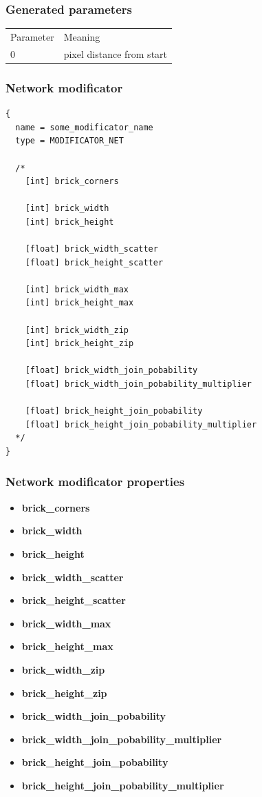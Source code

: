 \documentclass[9pt]{article}
\begin{document}
\subsubsection*{Generated parameters}

\begin{tabular}{|l||l|}
  Parameter & Meaning \\
  0 & pixel distance from start \\
\end{tabular}

\subsubsection{Network modificator}

\begin{verbatim}
{
  name = some_modificator_name
  type = MODIFICATOR_NET

  /*
    [int] brick_corners
        
    [int] brick_width
    [int] brick_height
        
    [float] brick_width_scatter
    [float] brick_height_scatter
        
    [int] brick_width_max
    [int] brick_height_max
        
    [int] brick_width_zip
    [int] brick_height_zip
        
    [float] brick_width_join_pobability
    [float] brick_width_join_pobability_multiplier
        
    [float] brick_height_join_pobability
    [float] brick_height_join_pobability_multiplier
  */
}
\end{verbatim}
\subsubsection*{Network modificator properties}
\begin{itemize}
\item{\bf brick\_corners}
\item{\bf brick\_width}
\item{\bf brick\_height}
\item{\bf brick\_width\_scatter}
\item{\bf brick\_height\_scatter}
\item{\bf brick\_width\_max}
\item{\bf brick\_height\_max}
\item{\bf brick\_width\_zip}
\item{\bf brick\_height\_zip}
\item{\bf brick\_width\_join\_pobability}
\item{\bf brick\_width\_join\_pobability\_multiplier}
\item{\bf brick\_height\_join\_pobability}
\item{\bf brick\_height\_join\_pobability\_multiplier}
\end{itemize}
\end{document}
